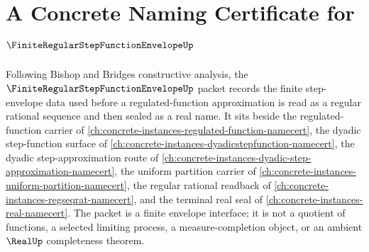 \chapter{A Concrete Naming Certificate for $\FiniteRegularStepFunctionEnvelopeUp$}
\label{ch:concrete-instances-finite-regular-step-function-envelope-namecert}

Following Bishop and Bridges constructive analysis, the $\FiniteRegularStepFunctionEnvelopeUp$ packet records the finite step-envelope data used before a regulated-function approximation is read as a regular rational sequence and then sealed as a real name. It sits beside the regulated-function carrier of \autoref{ch:concrete-instances-regulated-function-namecert}, the dyadic step-function surface of \autoref{ch:concrete-instances-dyadicstepfunction-namecert}, the dyadic step-approximation route of \autoref{ch:concrete-instances-dyadic-step-approximation-namecert}, the uniform partition carrier of \autoref{ch:concrete-instances-uniform-partition-namecert}, the regular rational readback of \autoref{ch:concrete-instances-regseqrat-namecert}, and the terminal real seal of \autoref{ch:concrete-instances-real-namecert}. The packet is a finite envelope interface; it is not a quotient of functions, a selected limiting process, a measure-completion object, or an ambient $\RealUp$ completeness theorem.

